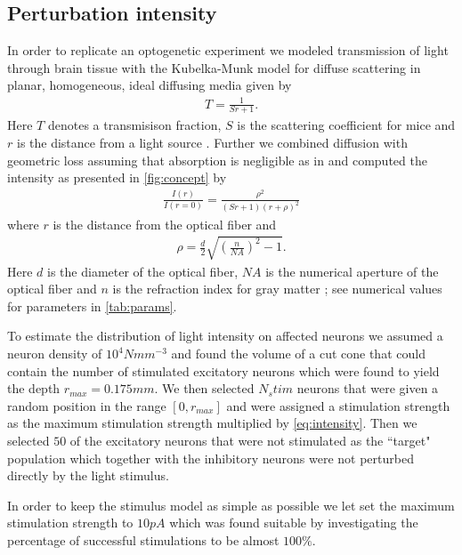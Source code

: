 \documentclass[11pt]{article}
\begin{document}
\subsection{Perturbation intensity}\label{sec:method:opto}
In order to replicate an optogenetic experiment we modeled transmission of light through brain tissue with the Kubelka-Munk model for diffuse scattering in planar, homogeneous, ideal diffusing media given by
\begin{align}
T = \frac{1}{Sr + 1}.
\end{align}
Here $ T $ denotes a transmisison fraction, $ S $ is the scattering coefficient for mice \citep{Aravanis2007} and $ r $ is the distance from a light source \citep{Ho2017}. Further we combined diffusion with geometric loss assuming that absorption is negligible as in \cite{Aravanis2007} and computed the intensity as presented in \cref{fig:concept} by
\begin{align}
\label{eq:intensity}
\frac{I(r)}{I(r=0)} = \frac{\rho^2}{(Sr + 1)(r + \rho)^2}
\end{align}
where $ r $ is the distance from the optical fiber and
\begin{align}
\rho = \frac{d}{2}\sqrt{\left(\frac{n}{NA}\right)^2 - 1}.
\end{align}
Here $ d $ is the diameter of the optical fiber, $ NA $ is the numerical aperture of the optical fiber and $ n $ is the refraction index for gray matter \citep{Ho2017}; see numerical values for parameters in \cref{tab:params}.

To estimate the distribution of light intensity on affected neurons we assumed a neuron density of $ 10^4 Nmm^{-3} $ and found the volume of a cut cone that could contain the number of stimulated excitatory neurons which were found to yield the depth $ r_{max} = 0.175 mm $. We then selected $ N_stim $ neurons that were given a random position in the range $ [0, r_{max}] $ and were assigned a stimulation strength as the maximum stimulation strength multiplied by \cref{eq:intensity}. Then we selected $ 50 $ of the excitatory neurons that were not stimulated as the ``target" population which together with the inhibitory neurons were not perturbed directly by the light stimulus.

In order to keep the stimulus model as simple as possible we let set the maximum stimulation strength to $ 10 pA $ which was found suitable by investigating the percentage of successful stimulations to be almost $ 100\% $.

\pagestyle{empty}

{\footnotesize\linespread{1}
}
\end{document}
